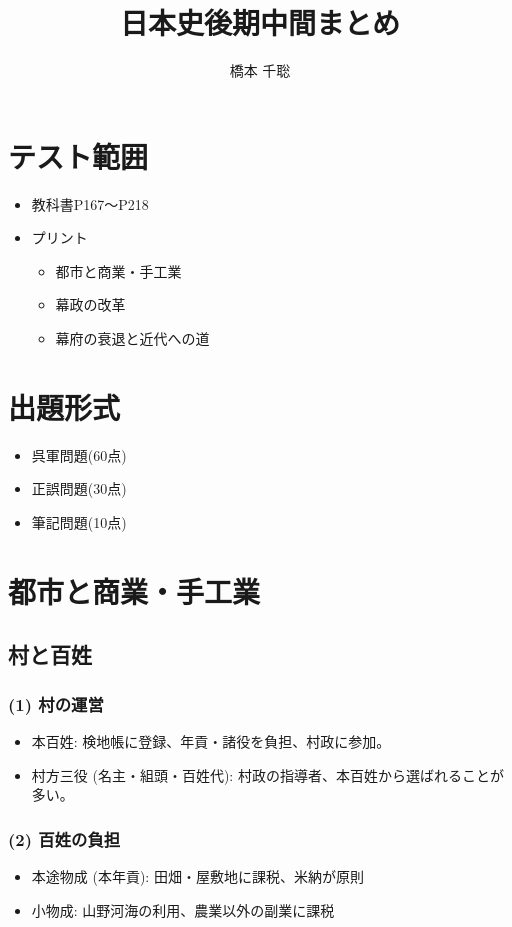 \documentclass[a4paper,11pt]{jsarticle}
\title{日本史後期中間まとめ}
\date{\empty}
\author{橋本 千聡}
\begin{document}
\maketitle
\section*{テスト範囲}
\begin{itemize}
  \item 教科書P167～P218
  \item プリント
  \begin{itemize}
    \item 都市と商業・手工業
    \item 幕政の改革
    \item 幕府の衰退と近代への道
  \end{itemize}
\end{itemize}

\section*{出題形式}
\begin{itemize}
  \item 呉軍問題(60点)
  \item 正誤問題(30点)
  \item 筆記問題(10点)
\end{itemize}

\newpage

\section*{都市と商業・手工業}
\subsection*{村と百姓}
\subsubsection*{(1) 村の運営}
\begin{itemize}
  \item 本百姓: 検地帳に登録、年貢・諸役を負担、村政に参加。
  \item 村方三役 (名主・組頭・百姓代): 村政の指導者、本百姓から選ばれることが多い。
\end{itemize}

\subsubsection*{(2) 百姓の負担}
\begin{itemize}
  \item 本途物成 (本年貢): 田畑・屋敷地に課税、米納が原則
  \item 小物成: 山野河海の利用、農業以外の副業に課税
\end{itemize}
\end{document}
